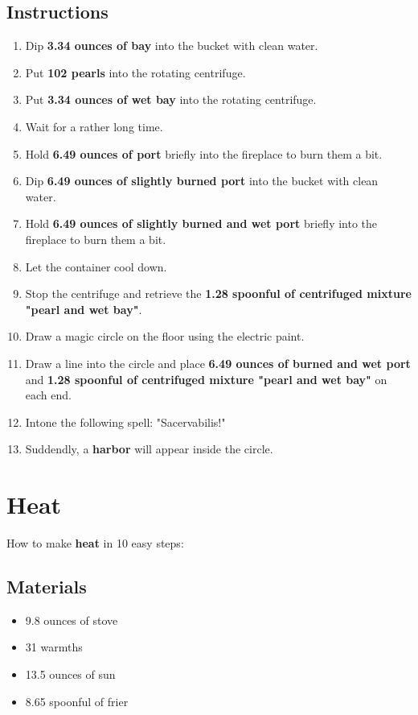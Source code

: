 \documentclass{article}
\begin{document}
\subsection{Instructions}\begin{enumerate}
\item 
Dip \textbf{3.34 ounces of bay} into the bucket with clean water.
\item 
Put \textbf{102 pearls} into the rotating centrifuge.
\item 
Put \textbf{3.34 ounces of wet bay} into the rotating centrifuge.
\item 
Wait for a rather long time.
\item 
Hold \textbf{6.49 ounces of port} briefly into the fireplace to burn them a bit.
\item 
Dip \textbf{6.49 ounces of slightly burned port} into the bucket with clean water.
\item 
Hold \textbf{6.49 ounces of slightly burned and wet port} briefly into the fireplace to burn them a bit.
\item 
Let the container cool down.
\item 
Stop the centrifuge and retrieve the \textbf{1.28 spoonful of centrifuged mixture "pearl and wet bay"}.
\item 
Draw a magic circle on the floor using the electric paint.
\item 
Draw a line into the circle and place \textbf{6.49 ounces of burned and wet port} and \textbf{1.28 spoonful of centrifuged mixture "pearl and wet bay"} on each end.
\item 
Intone the following spell: "Sacervabilis!"
\item 
Suddendly, a \textbf{harbor} will appear inside the circle.
\end{enumerate}
\newpage
\section{Heat}How to make \textbf{heat} in 10 easy steps:

\subsection{Materials}\begin{itemize}
\item 
9.8 ounces of stove
\item 
31 warmths
\item 
13.5 ounces of sun
\item 
8.65 spoonful of frier
\end{itemize}
\end{document}
